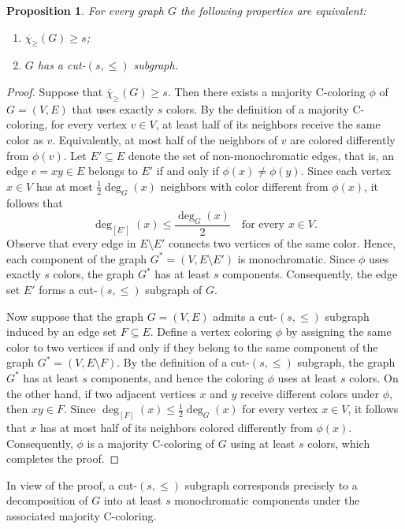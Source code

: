 \documentclass{article}
\newtheorem{proposition}[theorem]{Proposition}
\theoremstyle{definition}
\newcommand{\mc}{\overline{\chi}_{\geqslant}}
\begin{document}
\begin{proposition}
    For every graph $G$ the following properties are equivalent:
    \begin{enumerate}[label=\normalfont(\roman*)]
        \item $\mc (G) \geq s$;
        \item $G$ has a cut-$(s,\leqslant)$ subgraph.
    \end{enumerate}
    \label{prop:cutdeg}
\end{proposition}
\begin{proof}
    Suppose that $\mc(G) \ge s$. Then there exists a majority C-coloring
$\phi$ of $G=(V,E)$ that uses exactly $s$ colors.
By the definition of a majority C-coloring, for every vertex $v \in V$, at least half
of its neighbors receive the same color as $v$. Equivalently, at most half of the
neighbors of $v$ are colored differently from $\phi(v)$.
Let $E' \subseteq E$ denote the set of non-monochromatic edges, that is, an edge
$e=xy \in E$ belongs to $E'$ if and only if $\phi(x) \neq \phi(y)$.
Since each vertex $x \in V$ has at most $\frac{1}{2}\deg_G(x)$ neighbors with color different
from $\phi(x)$, it follows that
\[
\deg_{[E']}(x) \le \frac{\deg_G(x)}{2}
\quad \text{for every } x \in V.
\]
Observe that every edge in $E \setminus E'$ connects two vertices of the same color.
Hence, each component of the graph $G^* = (V, E \setminus E')$
is monochromatic.
Since $\phi$ uses exactly $s$ colors, the graph $G^*$ has at least $s$ components.
Consequently, the edge set $E'$ forms a cut-$(s,\leqslant)$ subgraph of $G$.

Now suppose that the graph $G=(V,E)$ admits a cut-$(s,\leqslant)$ subgraph induced by an edge
set $F \subseteq E$.
Define a vertex coloring $\phi$ by assigning the same color to two vertices if and
only if they belong to the same component of the graph $G^* = (V, E \setminus F)$.
By the definition of a cut-$(s,\leqslant)$ subgraph, the graph $G^*$ has at least $s$ 
components, and hence the coloring $\phi$ uses at least $s$ colors.
On the other hand, if two adjacent vertices $x$ and $y$ receive different colors under
$\phi$, then $xy \in F$.
Since $\deg_{[F]}(x) \le \frac{1}{2}\deg_G(x)$ for every vertex $x \in V$, it follows that $x$
has at most half of its neighbors colored differently from $\phi(x)$.
Consequently, $\phi$ is a majority C-coloring of $G$ using at least $s$ colors,
which completes the proof.

\end{proof}
In view of the proof, a cut-$(s,\leqslant)$ subgraph corresponds precisely to a decomposition of $G$ into at least 
$s$ monochromatic components under the associated majority C-coloring. %
\end{document}
